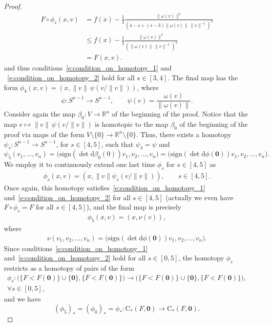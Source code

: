 \documentclass[reqno]{amsart}
\numberwithin{equation}{section}
\theoremstyle{personal}%
\theoremstyle{definition}
\newcommand{\R}{\mathds{R}}
\newcommand{\diff}{\mathrm{d}}
\newcommand{\Loc}{\mathrm{C}}
\begin{document}
\begin{proof}
\begin{align*}
F\circ\phi_s(x,v)
&=
f(x)
-\frac{1}{2} \frac{\|\omega(v)\|^2}{(4-s+(s-3)\|\omega(v)\|\,\|v\|^{-1})^2}\\
&\leq
f(x)
-\frac{1}{2} \frac{\|\omega(v)\|^2}{(\|\omega(v)\|\,\|v\|^{-1})^2}\\
&= F(x,v).
\end{align*}
and thus conditions~\eqref{e:condition_on_homotopy_1} and ~\eqref{e:condition_on_homotopy_2} hold for all $s\in[3,4]$. The final map has the form $\phi_4(x,v)=(x,\|v\|\,\psi(v/\|v\|))$, where 
\[
\psi:S^{n-1}\to S^{n-1}, 
\qquad
\psi(v)=\frac{\omega(v)}{\|\omega(v)\|}.
\]
Consider again the map $\beta_0:V\to\R^n$ of the beginning of the proof. Notice that the map $v\mapsto\|v\|\,\psi(v/\|v\|)$ is homotopic to the map $\beta_0$ of the beginning of the proof via maps of the form $V\setminus\{0\}\to\R^n\setminus\{0\}$. Thus, there exists a homotopy $\psi_s:S^{n-1}\to S^{n-1}$, for $s\in[4,5]$, such that $\psi_4=\psi$ and 
\[\psi_5(v_1,...,v_n)=\big(\mathrm{sign}(\det\diff\beta_0(0))v_1,v_2,...,v_n\big)=\big(\mathrm{sign}(\det\diff\phi(\bm0))v_1,v_2,...,v_n\big).\] 
We employ it to continuously extend one last time $\phi_s$ for $s\in[4,5]$ as
\begin{align*}
\phi_s(x,v)=(x,\|v\|\psi_s(v/\|v\|)),
\qquad s\in[4,5].
\end{align*}
Once again, this homotopy satisfies~\eqref{e:condition_on_homotopy_1} and~\eqref{e:condition_on_homotopy_2} for all $s\in[4,5]$ (actually we even have $F\circ\phi_s=F$ for all $s\in[4,5]$), and the final map is precisely
\begin{align}
\label{e:form_phi_5}
\phi_5(x,v)=(x,\nu(v)),
\end{align}
where
\begin{align*}
\nu(v_1,v_2,...,v_n)
=
\big(\mathrm{sign}(\det\diff\phi(\bm0))v_1,v_2,...,v_n\big).
\end{align*}
Since conditions~\eqref{e:condition_on_homotopy_1} and~\eqref{e:condition_on_homotopy_2} hold for all $s\in[0,5]$, the homotopy $\phi_s$ restricts as a homotopy of pairs of the form
\begin{align*}
 \phi_s:\big(\{F<F(\bm0)\}\cup\{\bm0\},\{F<F(\bm0)\}\big)\to\big(\{F<F(\bm0)\}\cup\{\bm0\},\{F<F(\bm0)\}\big),
 \\
 \forall s\in[0,5],
\end{align*}
and we have
\[
(\phi_5)_*
=(\phi_0)_*
=\phi_*
:\Loc_*(F,\bm0)\to\Loc_*(F,\bm0).
\]



\end{proof}
\end{document}
